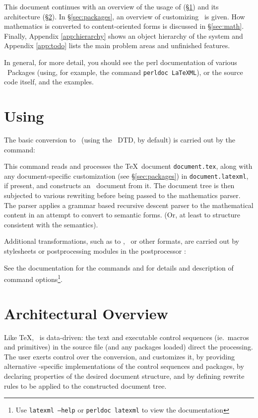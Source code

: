 \documentclass{article}
\begin{document}
\medskip
This document continues with an overview of the usage of \LaTeXML (\S\ref{sec:usage})
and its architecture (\S\ref{sec:architecture}).   
In \S\ref{sec:packages}, an overview of customizing \LaTeXML\ is given.
How mathematics is converted to content-oriented forms is discussed in \S\ref{sec:math}.
Finally, Appendix \ref{app:hierarchy} shows an object hierarchy of the system
and Appendix \ref{app:todo} lists the main problem areas and unfinished features.

In general, for more detail, you should see the perl documentation of various
\LaTeXML\ Packages (using, for example, the command \texttt{perldoc LaTeXML}),
or the source code itself, and the examples.

\section{Using \LaTeXML}\label{sec:usage}
The basic conversion to \XML\ (using the \LaTeXML\ DTD, by default) is carried out
by the command:
\begin{quote}
\end{quote}
This command reads and processes the \TeX\ document \texttt{document.tex},
along with any document-specific customization (see \S\ref{sec:packages})
in \texttt{document.latexml}, if present,
and constructs an \XML\ document from it.  The document tree is then subjected to various 
rewriting before being passed to the mathematics parser.  The parser applies a grammar based
recursive descent parser to the mathematical content in an attempt to convert
to semantic forms.  (Or, at least to structure consistent with the semantics).

Additional transformations, such as to \HTML, \MathML\ or other formats, are carried out
by stylesheets or postprocessing modules in the postprocessor :
\begin{quote}
\end{quote}

See the documentation for the commands  and  for details
and description of command options\footnote{Use \texttt{latexml --help} or 
\texttt{perldoc latexml} to view the documentation}.

\section{Architectural Overview}\label{sec:architecture}
Like \TeX, \LaTeXML\ is data-driven: the text and executable control
sequences (ie.~macros and primitives)
in the source file (and any packages loaded) direct the processing.
The user exerts control over the conversion, and customizes it, by 
providing alternative \LaTeXML-specific implementations of the control sequences and packages,
by declaring properties of the desired document structure,
and by defining rewrite rules to be applied to the constructed document tree.
\end{document}
